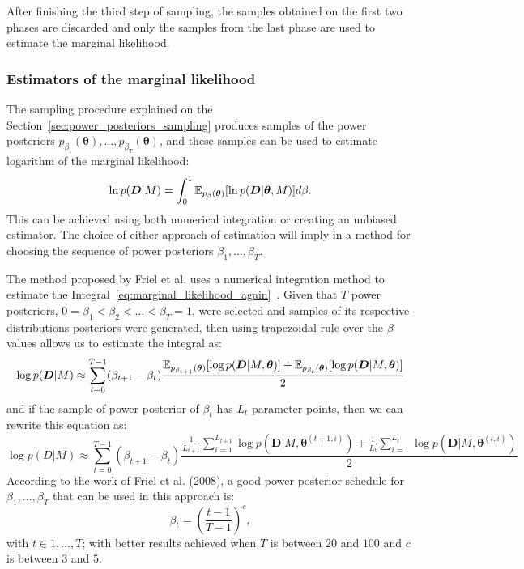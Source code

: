 After finishing the third step of sampling, the samples obtained on the
first two phases are discarded and only the samples from the last phase
are used to estimate the marginal likelihood.

\subsubsection{Estimators of the marginal likelihood}
The sampling procedure explained on the 
Section~\ref{sec:power_posteriors_sampling} produces samples of the 
power posteriors $p_{\beta_1} ({\bm \theta}), \ldots, p_{\beta_T} ({\bm
\theta})$, and these samples can be used to estimate logarithm of the 
marginal likelihood:
\begin{equation}
    \ln p ({\bm D} | M) = \int_0^1 \mathbb{E}_{p_\beta ({\bm \theta})} 
        [\ln p({\bm D}|{\bm \theta}, M)]d\beta.
    \label{eq:marginal_likelihood_again}
\end{equation}
This can be achieved using both numerical integration or creating an
unbiased estimator. The choice of either approach of estimation will
imply in a method for choosing the sequence of power posteriors 
$\beta_1, \ldots, \beta_T$. 

The method proposed by Friel et al. uses a numerical integration 
method to estimate the Integral~\ref{eq:marginal_likelihood_again}~\cite{Friel2008}. 
Given that $T$ power posteriors, $0 = \beta_1 < \beta_2 < \ldots <
\beta_T = 1$, were selected and samples of its respective distributions
posteriors were generated, then using trapezoidal rule over the $\beta$
values allows us to estimate the integral as:
\begin{equation*}
    \log{p({\bm D}| M)} \approx \sum_{t = 0}^{T - 1} (\beta_{t + 1} -
    \beta_t)
\frac{
    \mathbb{E}_{p_{\beta_{t + 1}} ({\bm \theta})}[\log p({\bm D} | M,
    {\bm \theta})]
+ 
    \mathbb{E}_{p_{\beta_{t}} ({\bm \theta})}[\log p({\bm D} | M,
    {\bm \theta})]}
{2}
\end{equation*}
and if the sample of power posterior of $\beta_t$ has $L_t$ parameter 
points, then we can rewrite this equation as:
\begin{equation}
\log{p(D| M)} \approx \sum_{t = 0}^{T - 1} (\beta_{t + 1} - \beta_t)
\frac{
    \frac{1}{L_{t + 1}}
    \sum_{i = 1}^{L_{t + 1}}  \log p({\bm D} | M, {\bm \theta}^{(t + 1,
    i)})
+ 
    \frac{1}{L_t}
    \sum_{i = 1}^{L_t}  \log p({\bm D} | M, {\bm \theta}^{(t, i)})}
{2}
    \label{eq:marginal_likelihood_trapezoidal_approximation}
\end{equation}
According to the work of Friel et al. (2008), a good power posterior 
schedule for $\beta_1, \ldots, \beta_T$ that can be used in this 
approach is:
\begin{equation*}
    \beta_t = \left(\frac{t - 1}{T - 1}\right)^{c}, 
\end{equation*}
with $t \in {1, \ldots, T}$; with better results achieved when $T$ is
between $20$ and $100$ and $c$ is between $3$ and $5$.


